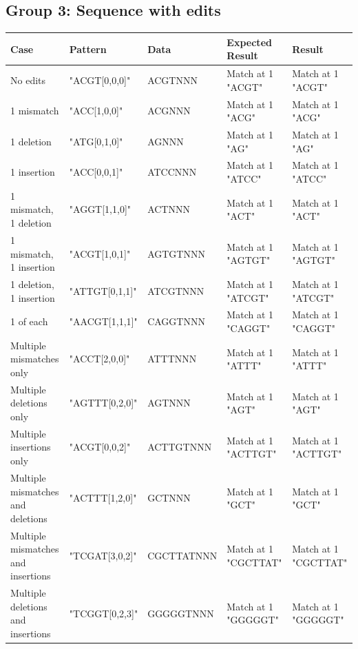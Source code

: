 \documentclass[12pt]{article}
\begin{document}
\begin{appendices}
\subsection{Group 3: Sequence with edits}
\begin{table}[H]
\begin{tabular}{p{4cm}|p{3.6cm}|p{2.5cm}|p{2.2cm}|p{2.2cm}}
Case 			& Pattern & Data & Expected Result & Result \\ \hline
\rowcolor{lightgreen}
No edits			& "ACGT[0,0,0]" & ACGTNNN & Match at 1 "ACGT" & Match at 1 "ACGT" \\ \hline
\rowcolor{lightgreen}
1 mismatch		& "ACC[1,0,0]" & ACGNNN & Match at 1 "ACG" & Match at 1 "ACG" \\ \hline
\rowcolor{lightgreen}
1 deletion		& "ATG[0,1,0]" & AGNNN & Match at 1 "AG" & Match at 1 "AG" \\ \hline
\rowcolor{lightgreen}
1 insertion		& "ACC[0,0,1]" & ATCCNNN & Match at 1 "ATCC" & Match at 1 "ATCC"\\ \hline
\rowcolor{lightgreen}
1 mismatch, 1 deletion 			& "AGGT[1,1,0]" & ACTNNN & Match at 1 "ACT" & Match at 1 "ACT" \\ \hline
\rowcolor{lightgreen}
1 mismatch, 1 insertion			& "ACGT[1,0,1]" & AGTGTNNN & Match at 1 "AGTGT" & Match at 1 "AGTGT" \\ \hline
\rowcolor{lightgreen}
1 deletion, 1 insertion 			& "ATTGT[0,1,1]" & ATCGTNNN & Match at 1 "ATCGT" & Match at 1 "ATCGT" \\ \hline
\rowcolor{lightgreen}
1 of each			& "AACGT[1,1,1]" & CAGGTNNN & Match at 1 "CAGGT" & Match at 1 "CAGGT" \\ \hline
\rowcolor{lightgreen}
Multiple mismatches only & "ACCT[2,0,0]" & ATTTNNN & Match at 1 "ATTT" & Match at 1 "ATTT" \\ \hline
\rowcolor{lightgreen}
Multiple deletions only & "AGTTT[0,2,0]" & AGTNNN & Match at 1 "AGT" & Match at 1 "AGT" \\ \hline
\rowcolor{lightgreen}
Multiple insertions only & "ACGT[0,0,2]" & ACTTGTNNN & Match at 1 "ACTTGT" & Match at 1 "ACTTGT" \\ \hline 
\rowcolor{lightgreen}
Multiple mismatches and deletions		& "ACTTT[1,2,0]" & GCTNNN & Match at 1 "GCT" & Match at 1 "GCT"\\ \hline
\rowcolor{lightgreen}
Multiple mismatches and insertions		& "TCGAT[3,0,2]" & CGCTTATNNN & Match at 1 "CGCTTAT" & Match at 1 "CGCTTAT" \\ \hline
\rowcolor{lightgreen}
Multiple deletions and insertions		& "TCGGT[0,2,3]" & GGGGGTNNN & Match at 1 "GGGGGT" & Match at 1 "GGGGGT" \\ \hline

\end{tabular}
\end{table}
\end{appendices}
\end{document}
